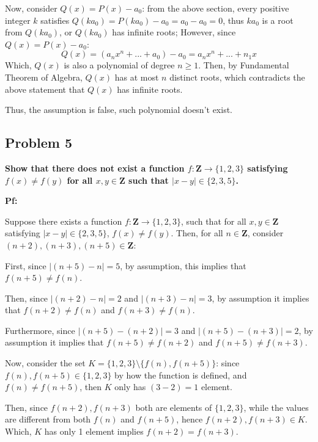 \documentclass{article}
\begin{document}
\hfill

Now, consider $Q(x)=P(x)-a_0$: from the above section, every positive integer $k$ satisfies $Q(ka_0)=P(ka_0)-a_0 = a_0-a_0 = 0$, thus $ka_0$ is a root from $Q(ka_0)$, or $Q(ka_0)$ has infinite roots; However, since $Q(x)=P(x)-a_0$:
$$Q(x)=(a_nx^n+...+a_0)-a_0 = a_nx^n+...+n_1x$$
Which, $Q(x)$ is also a polynomial of degree $n\geq 1$. Then, by Fundamental Theorem of Algebra, $Q(x)$ has at most  $n$ distinct roots, which contradicts the above statement that $Q(x)$ has infinite roots.

\hfill

Thus, the assumption is false, such polynomial doesn't exist.

\hfill

\subsection{Problem 5}
\textbf{Show that there does not exist a function $f:\mathbf{Z}\rightarrow \{1,2,3\}$
satisfying $f(x) \neq f(y)$ for all $x, y \in \mathbf{Z}$ such that $|x-y| \in \{2, 3, 5\}$.}

\hfill

\textbf{Pf:}

Suppose there exists a function $f:\mathbf{Z}\rightarrow \{1,2,3\}$, such that for all $x,y\in\mathbf{Z}$ satisfying $|x-y|\in \{2, 3, 5\}$, $f(x)\neq f(y)$. Then, for all $n\in\mathbf{Z}$, consider $(n+2),(n+3),(n+5)\in\mathbf{Z}$:

\hfill

First, since $|(n+5)-n| = 5$, by assumption, this implies that $f(n+5)\neq f(n)$.

Then, since $|(n+2)-n|=2$ and $|(n+3)-n|=3$, by assumption it implies that $f(n+2)\neq f(n)$ and $f(n+3)\neq f(n)$.

Furthermore, since $|(n+5)-(n+2)|=3$ and $|(n+5)-(n+3)|=2$, by assumption it implies that $f(n+5)\neq f(n+2)$ and $f(n+5)\neq f(n+3)$.

\hfill

Now, consider the set $K=\{1,2,3\}\setminus \{f(n),f(n+5)\}$: since $f(n),f(n+5)\in\{1,2,3\}$ by how the function is defined, and $f(n)\neq f(n+5)$, then $K$ only has $(3-2)=1$ element. 

Then, since $f(n+2), f(n+3)$ both are elements of $\{1,2,3\}$, while the values are different from both $f(n)$ and $f(n+5)$, hence $f(n+2),f(n+3)\in K$. Which, $K$ has only 1 element implies $f(n+2)=f(n+3)$.

\hfill
\end{document}
